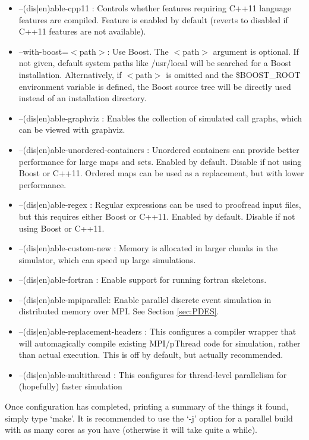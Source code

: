 \begin{itemize}
\item --(dis$|$en)able-cpp11 : Controls whether features requiring C++11 language features are compiled. Feature is enabled by default (reverts to disabled if C++11 features are not available).
\item --with-boost=$<$path$>$: Use Boost.
The $<$path$>$ argument is optional. If not given, default system paths like /usr/local will be searched for a Boost installation.
Alternatively, if $<$path$>$ is omitted and the \$BOOST\_ROOT environment variable is defined, the Boost source tree will be directly used
instead of an installation directory.
\item --(dis$|$en)able-graphviz : Enables the collection of simulated call graphs, which can be viewed with graphviz.
\item --(dis$|$en)able-unordered-containers : Unordered containers can provide better performance for large maps and sets.
Enabled by default. Disable if not using Boost or C++11. Ordered maps can be used as a replacement, but with lower performance.
\item --(dis$|$en)able-regex : Regular expressions can be used to proofread input files, but this requires either Boost or C++11.
Enabled by default. Disable if not using Boost or C++11.
\item --(dis$|$en)able-custom-new : Memory is allocated in larger chunks in the simulator, which can speed up large simulations.
\item --(dis$|$en)able-fortran : Enable support for running fortran skeletons.
\item --(dis$|$en)able-mpiparallel: Enable parallel discrete event simulation in distributed memory over MPI.  See Section \ref{sec:PDES}.
\item --(dis$|$en)able-replacement-headers : This configures a compiler wrapper that will automagically compile existing MPI/pThread code for simulation, rather than actual execution. This is off by default, but actually recommended.
\item --(dis$|$en)able-multithread : This configures for thread-level parallelism for (hopefully) faster simulation
\end{itemize}

Once configuration has completed, printing a summary of the things it found, simply type `make'.  
It is recommended to use the `-j' option for a parallel build with as many cores as you have (otherwise it will take quite a while).  

